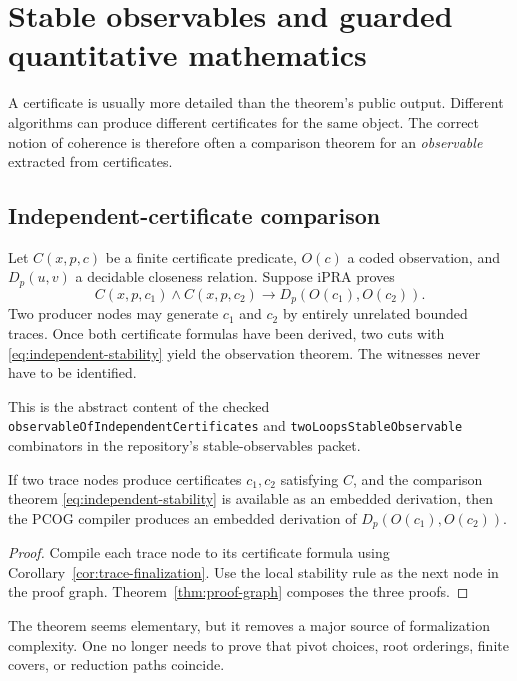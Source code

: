 \section{Stable observables and guarded quantitative mathematics}
\label{sec:observables}

A certificate is usually more detailed than the theorem's public output.
Different algorithms can produce different certificates for the same object.
The correct notion of coherence is therefore often a comparison theorem for an
\emph{observable} extracted from certificates.

\subsection{Independent-certificate comparison}

Let \(C(x,p,c)\) be a finite certificate predicate, \(O(c)\) a coded
observation, and \(D_p(u,v)\) a decidable closeness relation.  Suppose iPRA
proves
\begin{equation}
 C(x,p,c_1)\wedge C(x,p,c_2)
 \longrightarrow D_p(O(c_1),O(c_2)).
 \label{eq:independent-stability}
\end{equation}
Two producer nodes may generate \(c_1\) and \(c_2\) by entirely unrelated
bounded traces.  Once both certificate formulas have been derived, two cuts
with \eqref{eq:independent-stability} yield the observation theorem.  The
witnesses never have to be identified.

This is the abstract content of the checked
\texttt{observableOfIndependentCertificates} and
\texttt{twoLoopsStableObservable} combinators in the repository's
stable-observables packet.

\begin{theorem}
\label{thm:witness-independent}
If two trace nodes produce certificates \(c_1,c_2\) satisfying \(C\), and the
comparison theorem \eqref{eq:independent-stability} is available as an embedded
derivation, then the PCOG compiler produces an embedded derivation of
\(D_p(O(c_1),O(c_2))\).
\end{theorem}

\begin{proof}
Compile each trace node to its certificate formula using
Corollary~\ref{cor:trace-finalization}.  Use the local stability rule as the
next node in the proof graph.  Theorem~\ref{thm:proof-graph} composes the three
proofs.
\end{proof}

The theorem seems elementary, but it removes a major source of formalization
complexity.  One no longer needs to prove that pivot choices, root orderings,
finite covers, or reduction paths coincide.

